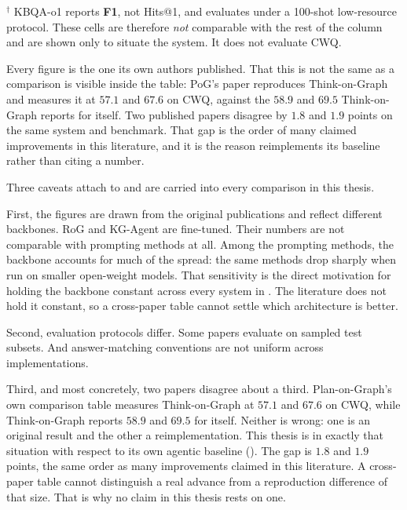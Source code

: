 \begin{table}[!tb]
\begin{center}
    \vspace{1mm}
    {\footnotesize $^{\dagger}$ KBQA-o1 reports \textbf{F1}, not Hits@1, and
    evaluates under a 100-shot low-resource protocol. These cells are therefore
    \emph{not} comparable with the rest of the column and are shown only to
    situate the system. It does not evaluate CWQ.

    \vspace{0.7mm}
    Every figure is the one its own authors published. That this is not the same
    as a comparison is visible inside the table: PoG's paper reproduces
    Think-on-Graph and measures it at $57.1$ and $67.6$ on CWQ, against the
    $58.9$ and $69.5$ Think-on-Graph reports for itself. Two published papers
    disagree by $1.8$ and $1.9$ points on the same system and benchmark. That
    gap is the order of many claimed improvements in this literature, and it is
    the reason  reimplements its baseline rather than citing a
    number.}
  \end{center}
\end{table}

Three caveats attach to  and are carried into every
comparison in this thesis.

First, the figures are drawn from the original publications and reflect
different backbones. RoG and KG-Agent are fine-tuned. Their numbers are not
comparable with prompting methods at all. Among the prompting methods, the
backbone accounts for much of the spread: the same methods drop sharply when
run on smaller open-weight models. That sensitivity is the direct motivation
for holding the backbone constant across every system in . The
literature does not hold it constant, so a cross-paper table cannot settle which
architecture is better.

Second, evaluation protocols differ. Some papers evaluate on sampled test
subsets. And answer-matching conventions are not uniform across
implementations.

Third, and most concretely, two papers disagree about a third. Plan-on-Graph's
own comparison table measures Think-on-Graph at $57.1$ and $67.6$ on CWQ, while
Think-on-Graph reports $58.9$ and $69.5$ for itself. Neither is wrong: one is an
original result and the other a reimplementation. This thesis is in exactly
that situation with respect to its own agentic baseline
(). The gap is $1.8$ and $1.9$ points, the same order as
many improvements claimed in this literature. A cross-paper table cannot
distinguish a real advance from a reproduction difference of that size. That is
why no claim in this thesis rests on one.

